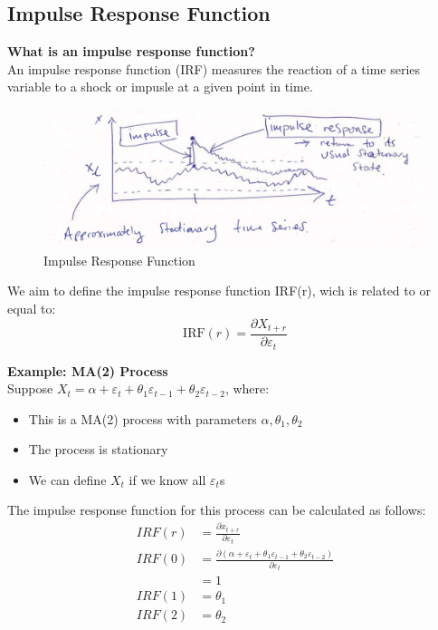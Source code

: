 \subsection{Impulse Response Function}
\textbf{What is an impulse response function?} \\

An impulse response function (IRF) measures the reaction of a time series variable to a shock or impusle at a given point in time.

\begin{figure}[H]
    \centering
    \includegraphics[width=0.8\linewidth]{images/Screenshot 2024-05-21 at 18.13.20.jpg}
    \caption{Impulse Response Function}
\end{figure}


We aim to define the impulse response function IRF(r), wich is related to or equal to: \[
 \text{IRF}(r) = \frac{ \partial X_{t+r} }{ \partial \varepsilon_t }
\]

\textbf{Example: MA(2) Process}\\

Suppose $X_t=\alpha + \varepsilon_t +\theta_1 \varepsilon_{t-1} + \theta_2 \varepsilon_{t-2}$, where:
\begin{itemize}
    \item This is a MA(2) process with parameters $\alpha, \theta_1, \theta_2$
    \item The process is stationary
    \item We can define $X_t$ if we know all $\varepsilon_t$s 
\end{itemize}
The impulse response function for this process can be calculated as follows: 
\begin{align*}
    IRF(r)&=\frac{\partial x_{t+r}}{\partial \varepsilon_t}\\
    IRF(0)&= \frac{\partial(\alpha+\varepsilon_t+\theta_1 \varepsilon_{t-1}+\theta_2 \varepsilon_{t-2})}{\partial \varepsilon_t}\\ 
    &=1\\
    IRF(1)&=\theta_1\\
    IRF(2)&=\theta_2
    \end{align*}


